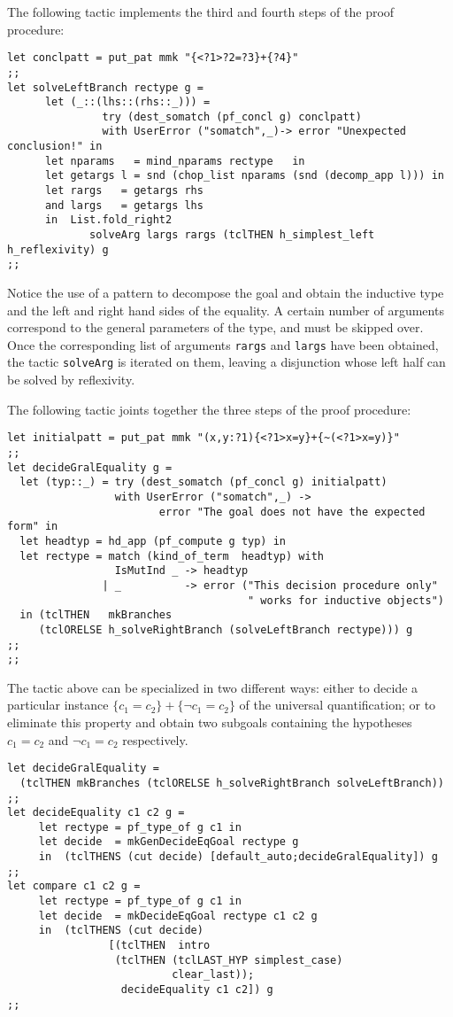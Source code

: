 The following tactic implements the third and fourth steps of the
proof procedure:

\begin{verbatim}
let conclpatt = put_pat mmk "{<?1>?2=?3}+{?4}"
;;
let solveLeftBranch rectype g = 
      let (_::(lhs::(rhs::_))) = 
               try (dest_somatch (pf_concl g) conclpatt) 
               with UserError ("somatch",_)-> error "Unexpected conclusion!" in
      let nparams   = mind_nparams rectype   in
      let getargs l = snd (chop_list nparams (snd (decomp_app l))) in
      let rargs   = getargs rhs
      and largs   = getargs lhs
      in  List.fold_right2 
             solveArg largs rargs (tclTHEN h_simplest_left h_reflexivity) g
;;
\end{verbatim}

Notice the use of a pattern to decompose the goal and obtain the
inductive type and the left and right hand sides of the equality. A
certain number of arguments correspond to the general parameters of
the type, and must be skipped over. Once the corresponding list of
arguments \texttt{rargs} and \texttt{largs} have been obtained, the
tactic \texttt{solveArg} is iterated on them, leaving a disjunction
whose left half can be solved by reflexivity.

The following tactic joints together the three steps of the 
proof procedure:

\begin{verbatim}
let initialpatt = put_pat mmk "(x,y:?1){<?1>x=y}+{~(<?1>x=y)}"
;;
let decideGralEquality g = 
  let (typ::_) = try (dest_somatch (pf_concl g) initialpatt)
                 with UserError ("somatch",_) -> 
                        error "The goal does not have the expected form" in
  let headtyp = hd_app (pf_compute g typ) in
  let rectype = match (kind_of_term  headtyp) with
                 IsMutInd _ -> headtyp 
               | _          -> error ("This decision procedure only"
                                      " works for inductive objects") 
  in (tclTHEN   mkBranches 
     (tclORELSE h_solveRightBranch (solveLeftBranch rectype))) g
;;
;;
\end{verbatim}

The tactic above can be specialized in two different ways: either to
decide a particular instance $\{c_1=c_2\}+\{\neg c_1=c_2\}$ of the
universal quantification; or to eliminate this property and obtain two
subgoals containing the hypotheses $c_1=c_2$ and $\neg c_1=c_2$
respectively.

\begin{verbatim}
let decideGralEquality = 
  (tclTHEN mkBranches (tclORELSE h_solveRightBranch solveLeftBranch))
;;
let decideEquality c1 c2 g = 
     let rectype = pf_type_of g c1 in
     let decide  = mkGenDecideEqGoal rectype g
     in  (tclTHENS (cut decide) [default_auto;decideGralEquality]) g
;;
let compare c1 c2 g = 
     let rectype = pf_type_of g c1 in
     let decide  = mkDecideEqGoal rectype c1 c2 g
     in  (tclTHENS (cut decide) 
                [(tclTHEN  intro 
                 (tclTHEN (tclLAST_HYP simplest_case)
                          clear_last));
                  decideEquality c1 c2]) g
;;
\end{verbatim}

